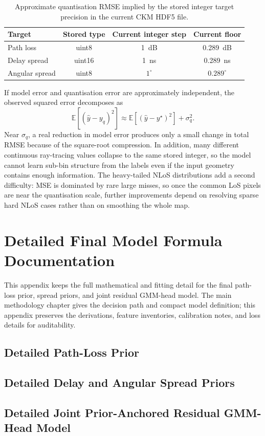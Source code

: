 \begin{table}[H]
\centering
\caption[Approximate RMSE floor from target quantisation.]%
{Approximate quantisation RMSE implied by the stored integer target precision
in the current CKM HDF5 file.}
\label{tab:quantisation_floor}
\begin{tabular}{lccc}
\toprule
Target & Stored type & Current integer step & Current floor \\
\midrule
Path loss & uint8 & \SI{1}{dB} & \SI{0.289}{dB} \\
Delay spread & uint16 & \SI{1}{ns} & \SI{0.289}{ns} \\
Angular spread & uint8 & \(1^\circ\) & \(0.289^\circ\) \\
\bottomrule
\end{tabular}
\end{table}

If model error and quantisation error are approximately independent, the
observed squared error decomposes as
\[
  \mathbb{E}\!\left[(\hat{y}-y_q)^2\right]
  \approx
  \mathbb{E}\!\left[(\hat{y}-y^\star)^2\right] + \sigma_q^2 .
\]
Near \(\sigma_q\), a real reduction in model error produces only a small change
in total RMSE because of the square-root compression. In addition, many
different continuous ray-tracing values collapse to the same stored integer, so
the model cannot learn sub-bin structure from the labels even if the input
geometry contains enough information. The heavy-tailed NLoS distributions add a
second difficulty: MSE is dominated by rare large misses, so once the common
LoS pixels are near the quantisation scale, further improvements depend on
resolving sparse hard NLoS cases rather than on smoothing the whole map.

\chapter{Detailed Final Model Formula Documentation}
\label{app:formula_details}

This appendix keeps the full mathematical and fitting detail for the final
path-loss prior, spread priors, and joint residual GMM-head model. The main
methodology chapter gives the decision path and compact model definition; this
appendix preserves the derivations, feature inventories, calibration notes, and
loss details for auditability.

\section{Detailed Path-Loss Prior}


\section{Detailed Delay and Angular Spread Priors}


\section{Detailed Joint Prior-Anchored Residual GMM-Head Model}

